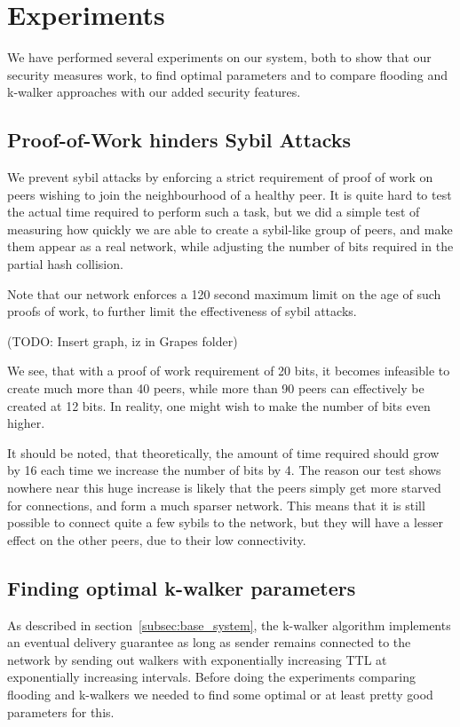 \section{Experiments}
We have performed several experiments on our system, both to show that our security measures work, to find optimal parameters and to compare flooding and k-walker approaches with our added security features.

\subsection{Proof-of-Work hinders Sybil Attacks}
We prevent sybil attacks by enforcing a strict requirement of proof of work on peers wishing to join the neighbourhood of a healthy peer. It is quite hard to test the actual time required to perform such a task, but we did a simple test of measuring how quickly we are able to create a sybil-like group of peers, and make them appear as a real network, while adjusting the number of bits required in the partial hash collision.

Note that our network enforces a 120 second maximum limit on the age of such proofs of work, to further limit the effectiveness of sybil attacks.

(TODO: Insert graph, iz in Grapes folder)

We see, that with a proof of work requirement of 20 bits, it becomes infeasible to create much more than 40 peers, while more than 90 peers can effectively be created at 12 bits. In reality, one might wish to make the number of bits even higher.

It should be noted, that theoretically, the amount of time required should grow by 16 each time we increase the number of bits by 4. The reason our test shows nowhere near this huge increase is likely that the peers simply get more starved for connections, and form a much sparser network. This means that it is still possible to connect quite a few sybils to the network, but they will have a lesser effect on the other peers, due to their low connectivity.

\subsection{Finding optimal k-walker parameters}
As described in section~\ref{subsec:base_system}, the k-walker algorithm implements an eventual delivery guarantee as long as sender remains connected to the network by sending out walkers with exponentially increasing TTL at exponentially increasing intervals. Before doing the experiments comparing flooding and k-walkers we needed to find some optimal or at least pretty good parameters for this.

